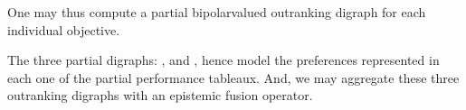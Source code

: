 \documentclass[a4paper,10pt,english]{sphinxhowto}
\begin{document}
One may thus compute a partial bipolar\sphinxhyphen{}valued outranking digraph for each individual objective.

\begin{sphinxVerbatim}[commandchars=\\\{\},numbers=left,firstnumber=1,stepnumber=1]
\end{sphinxVerbatim}

The three partial digraphs: ,  and ,  hence model the preferences represented in each one of the partial performance tableaux. And, we may aggregate these three outranking digraphs with an epistemic fusion operator.
\end{document}
